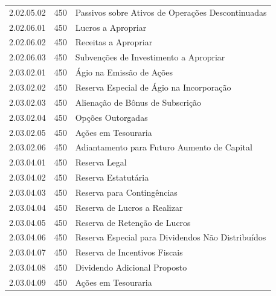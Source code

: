 \begin{table}[ht]
\begin{tabular}{lrl}
  2.02.05.02 & 450 & Passivos sobre Ativos de Operações Descontinuadas \\ 
  2.02.06.01 & 450 & Lucros a Apropriar \\ 
  2.02.06.02 & 450 & Receitas a Apropriar \\ 
  2.02.06.03 & 450 & Subvenções de Investimento a Apropriar \\ 
  2.03.02.01 & 450 & Ágio na Emissão de Ações \\ 
  2.03.02.02 & 450 & Reserva Especial de Ágio na Incorporação \\ 
  2.03.02.03 & 450 & Alienação de Bônus de Subscrição \\ 
  2.03.02.04 & 450 & Opções Outorgadas \\ 
  2.03.02.05 & 450 & Ações em Tesouraria \\ 
  2.03.02.06 & 450 & Adiantamento para Futuro Aumento de Capital \\ 
  2.03.04.01 & 450 & Reserva Legal \\ 
  2.03.04.02 & 450 & Reserva Estatutária \\ 
  2.03.04.03 & 450 & Reserva para Contingências \\ 
  2.03.04.04 & 450 & Reserva de Lucros a Realizar \\ 
  2.03.04.05 & 450 & Reserva de Retenção de Lucros \\ 
  2.03.04.06 & 450 & Reserva Especial para Dividendos Não Distribuídos \\ 
  2.03.04.07 & 450 & Reserva de Incentivos Fiscais \\ 
  2.03.04.08 & 450 & Dividendo Adicional Proposto \\ 
  2.03.04.09 & 450 & Ações em Tesouraria \\ 
   \hline
\end{tabular}
\end{table}
